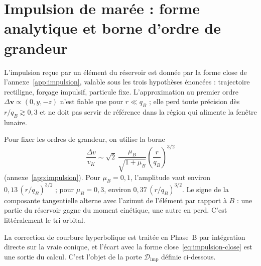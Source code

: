 \documentclass[11pt,a4paper,openany]{report}
\begin{document}
\section{Impulsion de marée : forme analytique et borne d'ordre de grandeur}

L'impulsion reçue par un élément du réservoir est donnée par la forme close de
l'annexe~\ref{app:impulsion}, valable sous les trois hypothèses énoncées : trajectoire rectiligne,
forçage impulsif, particule fixe. L'approximation au premier ordre
$\Delta\mathbf{v}\propto(0,y,-z)$ n'est fiable que pour $r\ll q_B$ ; elle perd toute précision dès
$r/q_B\gtrsim0{,}3$ et ne doit pas servir de référence dans la région qui alimente la fenêtre
lunaire.

Pour fixer les ordres de grandeur, on utilise la borne
\begin{equation}
\frac{\Delta v}{v_K}\sim\sqrt2\,\frac{\mu_B}{\sqrt{1+\mu_B}}
\left(\frac{r}{q_B}\right)^{3/2}
\label{eq:impulsion}
\end{equation}
(annexe~\ref{app:impulsion}). Pour $\mu_B=0{,}1$, l'amplitude vaut environ $0{,}13\,(r/q_B)^{3/2}$ ;
pour $\mu_B=0{,}3$, environ $0{,}37\,(r/q_B)^{3/2}$. Le signe de la composante tangentielle alterne
avec l'azimut de l'élément par rapport à $B$ : une partie du réservoir gagne du moment cinétique,
une autre en perd. C'est littéralement le tri orbital.

La correction de courbure hyperbolique est traitée en Phase~B par intégration directe sur la vraie
conique, et l'écart avec la forme close~\eqref{eq:impulsion-close} est une sortie du calcul. C'est
l'objet de la porte $\mathcal{D}_{\mathrm{imp}}$ définie ci-dessous.
\end{document}
